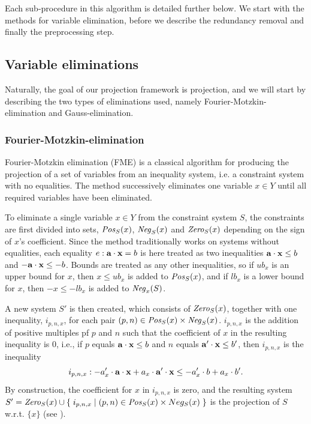 Each sub-procedure in this algorithm is detailed further below. We start with the methods for variable elimination, before we describe the redundancy removal and finally the preprocessing step.

\subsection{Variable eliminations}
Naturally, the goal of our projection framework is projection, and we will start by describing the two types of eliminations used, namely Fourier-Motzkin-elimination and Gauss-elimination. 
\subsubsection{Fourier-Motzkin-elimination}
Fourier-Motzkin elimination (FME) is a classical algorithm for producing the projection of a set of variables from an inequality system, i.e. a constraint system with no equalities.
The method successively eliminates one variable $x\in Y$ until all required variables have been eliminated.  

To eliminate a single variable $x\in Y$ from the constraint system $S$, the constraints are first divided into sets, $\mathit{Pos}_S(x)$, $\mathit{Neg}_S(x)$ and $\mathit{Zero}_S(x)$ depending on the sign of $x$'s coefficient. Since the method traditionally works on systems without equalities, each equality $e: \mathbf{a}\cdot\mathbf{x} = b$ is here treated as two inequalities $\mathbf{a}\cdot\mathbf{x} \leq b$ and $-\mathbf{a}\cdot\mathbf{x} \leq -b$. Bounds are treated as any other inequalities, so if $ub_x$ is an upper bound for $x$, then $x\leq ub_x$ is added to $\mathit{Pos}_S(x)$, and if $lb_x$ is a lower bound for $x$, then $-x\leq - lb_x$ is added to $\mathit{Neg}_x(S)$.

A new system $S'$ is then created, which consists of $\mathit{Zero}_S(x)$, together with one inequality, $i_{p,n,x}$, for each pair $(p,n)\in \mathit{Pos}_S(x)\times \mathit{Neg}_S(x)$. $i_{p,n,x}$ is the addition of positive multiples pf $p$ and $n$ such that the coefficient of $x$ in the resulting inequality is $0$, i.e., if $p$ equals $\mathbf{a}\cdot\mathbf{x} \leq b$ and $n$ equals $\mathbf{a}'\cdot\mathbf{x} \leq b'$, then $i_{p,n,x}$ is the inequality 
\[
i_{p,n,x}: -a'_x\cdot \mathbf{a}\cdot\mathbf{x} + a_x\cdot \mathbf{a}'\cdot\mathbf{x} \leq -a'_x\cdot b + a_x\cdot b'.
\]
By construction, the coefficient for $x$ in $i_{p,n,x}$ is zero, and the resulting system $S' = \mathit{Zero}_S(x) \cup\\
\{\;{i_{p,n,x}}\;|\;{(p,n)\in \mathit{Pos}_S(x)\times Neg_S(x)}\;\}$ is the projection of $S$ w.r.t. $\{x\}$ (see \cite{MyTechRep}). %

